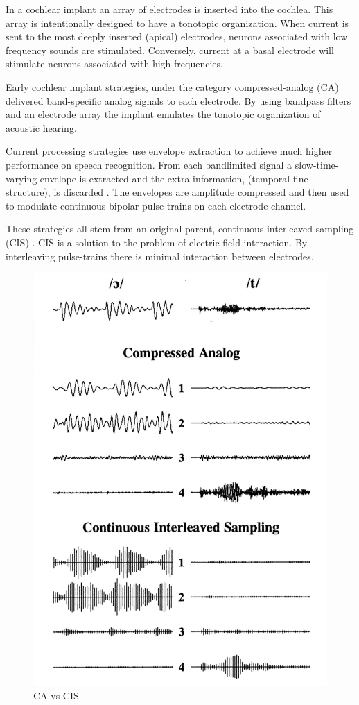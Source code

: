 \documentclass [11pt, proquest,oneside] {ganter_thesis}[2015/03/03]
\begin{document}

In a cochlear implant an array of electrodes is inserted into the cochlea.  This array is intentionally designed to have a tonotopic organization.  When current is sent to the most deeply inserted (apical) electrodes, neurons associated with low frequency sounds are stimulated.  Conversely, current at a basal electrode will stimulate neurons associated with high frequencies.

Early cochlear implant strategies, under the category compressed-analog (CA) delivered band-specific analog signals to each electrode.  By using bandpass filters and an electrode array the implant emulates the tonotopic organization of acoustic hearing.

Current processing strategies use envelope extraction to achieve much higher performance on speech recognition.  From each bandlimited signal a slow-time-varying envelope is extracted and the extra information,  (temporal fine structure), is discarded \cite{vandali2005pitch}.  The envelopes are amplitude compressed and then used to modulate continuous bipolar pulse trains on each electrode channel.

These strategies all stem from an original parent, continuous-interleaved-sampling (CIS) \cite{wilson1993design}.  CIS is a solution to the problem of electric field interaction.  By interleaving pulse-trains there is minimal interaction between electrodes.


\begin{figure}[!ht]
  \centering
    \includegraphics[width=.5\textwidth]{caVScis}   
    \caption{CA vs CIS \cite{wilson1993design}}
\end{figure}
\end{document}
